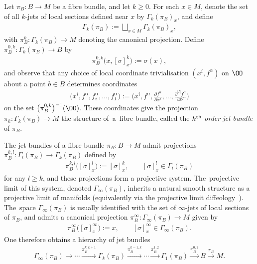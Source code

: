 \begin{Definition}
Let $\pi_{B}\colon B\rightarrow M$ be a fibre bundle, and let $k\geq 0$. For each $x\in M$, denote the set of all $k$-jets of local sections defined near $x$ by $\Gamma_{k}(\pi_{B})_{x}$, and define
\begin{gather*}
\Gamma_{k}(\pi_{B}):=\bigsqcup_{x\in M}\Gamma_{k}(\pi_{B})_{x},
\end{gather*}
with $\pi_{B}^{k}\colon \Gamma_{k}(\pi_{B})\rightarrow M$ denoting the canonical projection. Define $\pi_{B}^{0,k}\colon \Gamma_{k}(\pi_{B})\rightarrow B$ by
\begin{gather*}
\pi_{B}^{0,k}\big(x,[\sigma]^{k}_{x}\big):=\sigma(x),
\end{gather*}
and observe that any choice of local coordinate trivialisation $(x^{i},f^{\alpha})$ on $\OO$ about a point $b\in B$ determines coordinates
\begin{gather*}%
\big(x^{i},f^{\alpha},f^{\alpha}_{i},\dots,f^{\alpha}_{I}\big):=\bigg(x^{i},f^{\alpha},\frac{\partial f^{\alpha}}{\partial x^{i}},\dots,\frac{\partial^{|I|}f^{\alpha}}{\partial x^{I}}\bigg)
\end{gather*}
on the set $\big(\pi^{0,k}_{B}\big)^{-1}(\OO)$. These coordinates give the projection $\pi_{k}\colon \Gamma_{k}(\pi_{B})\rightarrow M$ the structure of~a~fibre bundle, called the $k^{\rm th}$ \textit{order jet bundle} of $\pi_{B}$.
\end{Definition}

The jet bundles of a fibre bundle $\pi_{B}\colon B\rightarrow M$ admit projections $\pi_{B}^{k,l}\colon \Gamma_{l}(\pi_{B})\rightarrow \Gamma_{k}(\pi_{B})$ defined by
\begin{gather*}
\pi_{B}^{k,l}\big([\sigma]^{l}_{x}\big):=[\sigma]^{k}_{x},\qquad [\sigma]^{l}_{x}\in \Gamma_{l}(\pi_{B})
\end{gather*}
for any $l\geq k$, and these projections form a projective system. The~projective limit of this system, denoted $\Gamma_{\infty}(\pi_{B})$, inherits a natural smooth structure as a projective limit of manifolds \cite[Chapter One, Section A]{varbi} (equivalently via the projective limit diffeology~\cite[Section 1.39]{diffeology}). The~space $\Gamma_{\infty}(\pi_{B})$ is usually identified with the set of $\infty$-jets of local sections of $\pi_{B}$, and admits a canonical projection $\pi_{B}^{\infty}\colon \Gamma_{\infty}(\pi_{B})\rightarrow M$ given by
\begin{gather*}
\pi_{B}^{\infty}\big([\sigma]^{\infty}_{x}\big):=x,\qquad [\sigma]^{\infty}_{x}\in \Gamma_{\infty}(\pi_{B}).
\end{gather*}
One therefore obtains a hierarchy of jet bundles
\begin{gather*}
\Gamma_{\infty}(\pi_{B})\rightarrow\cdots\xrightarrow{\pi_{B}^{k,k+1}} \Gamma_{k}(\pi_{B})\xrightarrow{\pi_{B}^{k-1,k}}\cdots\xrightarrow{\pi_{B}^{1,2}} \Gamma_{1}(\pi_{B})\xrightarrow{\pi_{B}^{0,1}}B\xrightarrow{\pi_{B}}M.
\end{gather*}

